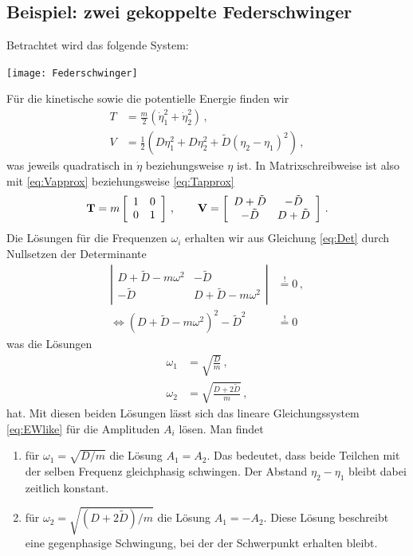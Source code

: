 \documentclass[paper=a4, fontsize=11.0pt, abstractoff, DIV12]{scrartcl}
\begin{document}
\subsection*{Beispiel: zwei gekoppelte Federschwinger}

Betrachtet wird das folgende System:
\begin{center}
    \texttt{[image: Federschwinger]}
\end{center}

Für die kinetische sowie die potentielle Energie finden wir
\begin{align}
T &= \frac{m}{2}\left(\dot\eta_1^2 +\dot\eta_2^2 \right)\, ,\\
V &= \frac{1}{2}\left(D\eta_1^2 + D\eta_2^2 + \tilde D (\eta_2 - \eta_1)^2\right)\, ,
\end{align}
was jeweils quadratisch in $\dot\eta$ beziehungsweise $\eta$ ist. In
Matrixschreibweise ist also mit \eqref{eq:Vapprox} beziehungsweise
\eqref{eq:Tapprox}
\begin{equation}
\mathbf{T} = m\left[ \begin{array}{cc} 1 & 0 \\ 0 & 1 \end{array} \right]\,,\qquad
\mathbf{V} = \left[ \begin{array}{cc} D + \tilde{D} & -\tilde{D} \\ -\tilde{D} & D + \tilde{D} \end{array} \right]\,.
\end{equation}
Die Lösungen für die Frequenzen $\omega_i$ erhalten wir aus Gleichung
\eqref{eq:Det} durch Nullsetzen der Determinante
\begin{align}
\left| \begin{array}{cc} D + \tilde D - m\omega^2& - \tilde D\\-\tilde D & D + \tilde D - m\omega^2\end{array} \right| &\stackrel{!}{=} 0 \, ,\nonumber\\
\Leftrightarrow	\left( D + \tilde D - m\omega^2\right)^2 - \tilde{D}^2 &\stackrel{!}{=} 0
\end{align}
was die Lösungen
\begin{align}
\omega_1 &= \sqrt{\frac{D}{m}}\,,\nonumber\\
\omega_2 &= \sqrt{\frac{D+2\tilde{D}}{m}}\,,\nonumber
\end{align}
hat. Mit diesen beiden Lösungen lässt sich das lineare Gleichungssystem
\eqref{eq:EWlike} für die Amplituden $A_i$ lösen. Man findet
\begin{enumerate}
    \item für $\omega_1 = \sqrt{D/m}$ die Lösung $A_1 = A_2$. Das bedeutet,
    dass beide Teilchen mit der selben Frequenz gleichphasig
    schwingen. Der Abstand $\eta_2 - \eta_1$ bleibt dabei zeitlich konstant.
    \item für $\omega_2 = \sqrt{(D+2\tilde D)/m}$ die Lösung $A_1 = -A_2$.
    Diese Lösung beschreibt eine gegenphasige Schwingung, bei der der Schwerpunkt
    erhalten bleibt.
\end{enumerate}
\end{document}
